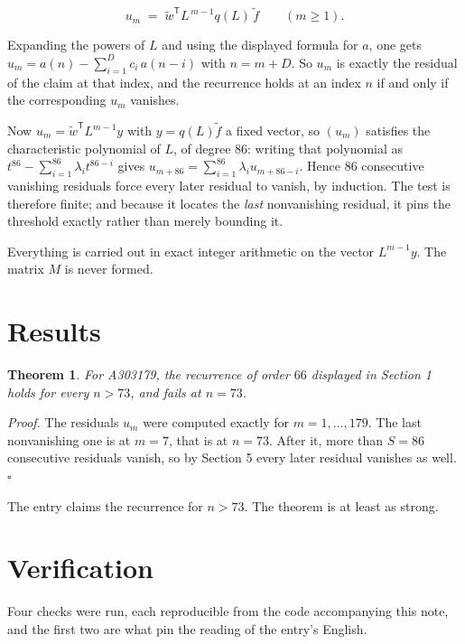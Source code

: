 \documentclass[11pt]{article}
\newtheorem{theorem}{Theorem}
\theoremstyle{definition}
\begin{document}
\[u_m \;=\; \tilde w^{\mathsf T} L^{\,m-1} q(L)\,\tilde f \qquad (m \ge 1).\]

Expanding the powers of $L$ and using the displayed formula for $a$, one gets $u_m = a(n) - \sum_{i=1}^{D} c_i\,a(n-i)$ with $n = m + D$. So $u_m$ is exactly the residual of the claim at that index, and the recurrence holds at an index $n$ if and only if the corresponding $u_m$ vanishes.

Now $u_m = \tilde w^{\mathsf T} L^{m-1} y$ with $y = q(L)\tilde f$ a fixed vector, so $(u_m)$ satisfies the characteristic polynomial of $L$, of degree $86$: writing that polynomial as $t^{86} - \sum_{i=1}^{86} \lambda_i t^{86-i}$ gives $u_{m+86} = \sum_{i=1}^{86} \lambda_i u_{m+86-i}$. Hence $86$ consecutive vanishing residuals force every later residual to vanish, by induction. The test is therefore finite; and because it locates the {\itshape last} nonvanishing residual, it pins the threshold exactly rather than merely bounding it.

Everything is carried out in exact integer arithmetic on the vector $L^{m-1}y$. The matrix $M$ is never formed.

\section{Results}

\begin{theorem} For A303179, the recurrence of order $66$ displayed in Section 1 holds for every $n > 73$, and fails at $n = 73$.\end{theorem}

{\itshape Proof.} The residuals $u_m$ were computed exactly for $m = 1,\dots,179$. The last nonvanishing one is at $m = 7$, that is at $n = 73$. After it, more than $S = 86$ consecutive residuals vanish, so by Section 5 every later residual vanishes as well. $\square$

The entry claims the recurrence for $n > 73$. The theorem is at least as strong.

\section{Verification}

Four checks were run, each reproducible from the code accompanying this note, and the first two are what pin the reading of the entry's English.
\end{document}
